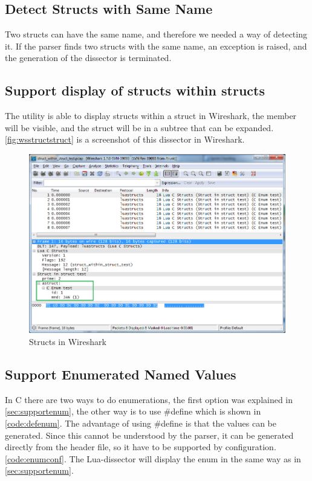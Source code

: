 

\subsection{Detect Structs with Same Name}
Two structs can have the same name, and therefore we needed a way of detecting it. 
If the parser finds two structs with the same name, an exception is 
raised, and the generation of the dissector is terminated.

\subsection{Support display of structs within structs}
The utility is able to display structs within a struct in Wireshark, the 
member will be visible, and the struct will be in a subtree that can be 
expanded. \autoref{fig:wsstructstruct} is a screenshot of this dissector in 
Wireshark.

\begin{figure}[ht]
	\center
	\includegraphics[width=\textwidth]{./sprints/img/wireshark_structwithstruct}
	\caption{Structs in Wireshark\label{fig:wsstructstruct}}
\end{figure}

\subsection{Support Enumerated Named Values}
In C there are two ways to do enumerations, the first option was explained in 
\autoref{sec:supportenum}, the other way is to use \#define which is shown in 
\autoref{code:defenum}. The advantage of using \#define is that the values 
can be generated. Since this cannot be understood by the parser, it can be 
generated directly from the header file, so it have to be supported by 
configuration. \autoref{code:enumconf}. The Lua-dissector will display the 
enum in the same way as in \autoref{sec:supportenum}.

